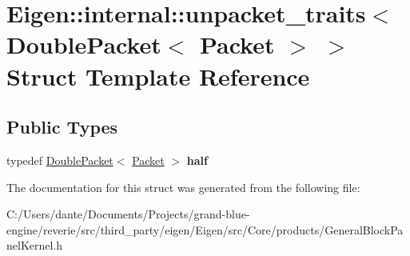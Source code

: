 \hypertarget{struct_eigen_1_1internal_1_1unpacket__traits_3_01_double_packet_3_01_packet_01_4_01_4}{}\section{Eigen\+::internal\+::unpacket\+\_\+traits$<$ Double\+Packet$<$ Packet $>$ $>$ Struct Template Reference}
\label{struct_eigen_1_1internal_1_1unpacket__traits_3_01_double_packet_3_01_packet_01_4_01_4}
\subsection*{Public Types}
\begin{DoxyCompactItemize}
\item 
\mbox{\label{struct_eigen_1_1internal_1_1unpacket__traits_3_01_double_packet_3_01_packet_01_4_01_4_adb8d3a8aae0ebb3ed80197eaa11886bb}} 
typedef \mbox{\hyperlink{struct_eigen_1_1internal_1_1_double_packet}{Double\+Packet}}$<$ \mbox{\hyperlink{union_eigen_1_1internal_1_1_packet}{Packet}} $>$ {\bfseries half}
\end{DoxyCompactItemize}


The documentation for this struct was generated from the following file\+:\begin{DoxyCompactItemize}
\item 
C\+:/\+Users/dante/\+Documents/\+Projects/grand-\/blue-\/engine/reverie/src/third\+\_\+party/eigen/\+Eigen/src/\+Core/products/General\+Block\+Panel\+Kernel.\+h\end{DoxyCompactItemize}
